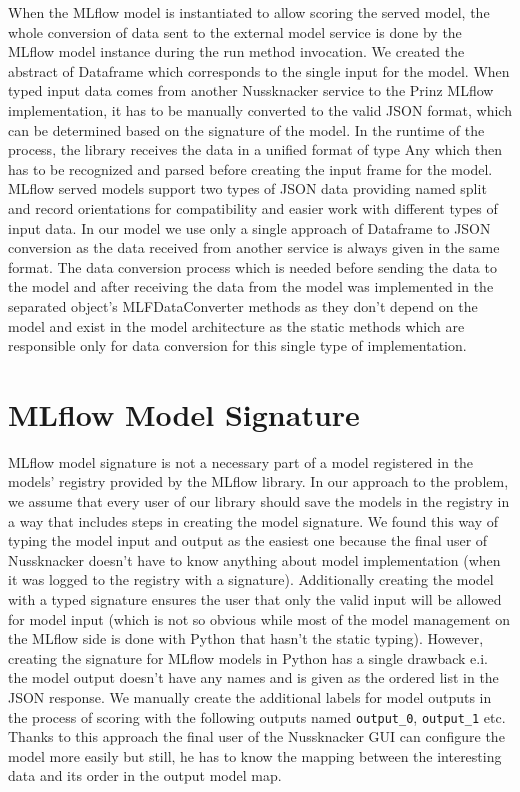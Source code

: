 When the MLflow model is instantiated to allow scoring the served model, the whole conversion of data
sent to the external model service is done by the MLflow model instance during the run method invocation.
We created the abstract of Dataframe which corresponds to the single input for the model. When typed input
data comes from another Nussknacker service to the Prinz MLflow implementation, it has to be manually
converted to the valid JSON format, which can be determined based on the signature of the model. In the
runtime of the process, the library receives the data in a unified format of type Any which then has to
be recognized and parsed before creating the input frame for the model. MLflow served models support two
types of JSON data providing named split and record orientations for compatibility and easier work with
different types of input data. In our model we use only a single approach of Dataframe to JSON conversion
as the data received from another service is always given in the same format. The data conversion process
which is needed before sending the data to the model and after receiving the data from the model was
implemented in the separated object’s MLFDataConverter methods as they don’t depend on the model and
exist in the model architecture as the static methods which are responsible only for data conversion
for this single type of implementation.

\section{MLflow Model Signature}

MLflow model signature is not a necessary part of a model registered in the models' registry
provided by the MLflow library. In our approach to the problem, we assume that every user of our library
should save the models in the registry in a way that includes steps in creating the model signature.
We found this way of typing the model input and output as the easiest one because the final user of
Nussknacker doesn’t have to know anything about model implementation (when it was logged to the registry
with a signature). Additionally creating the model with a typed signature ensures the user that only the
valid input will be allowed for model input (which is not so obvious while most of the model management
on the MLflow side is done with Python that hasn’t the static typing). However, creating the signature
for MLflow models in Python has a single drawback e.i. the model output doesn’t have any names and is
given as the ordered list in the JSON response. We manually create the additional labels for model outputs
in the process of scoring with the following outputs named \texttt{output\_0}, \texttt{output\_1} etc. Thanks to this
approach the final user of the Nussknacker GUI can configure the model more easily but still, he has
to know the mapping between the interesting data and its order in the output model map.


